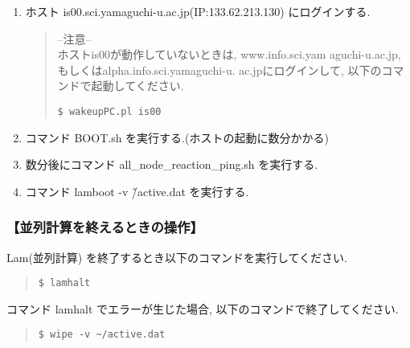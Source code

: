 \documentclass[a4paper,titlepage]{jreport}
\begin{document}
\begin{enumerate}
\item ホスト is00.sci.yamaguchi-u.ac.jp(IP:133.62.213.130) にログインする.\\

\begin{quote}
\begin{screen}
--注意-- \\

ホストis00が動作していないときは, www.info.sci.yam
aguchi-u.ac.jp,もしくはalpha.info.sci.yamaguchi-u.
ac.jpにログインして, 以下のコマンドで起動してください. \\

\begin{verbatim}
$ wakeupPC.pl is00
\end{verbatim}
\end{screen}
\end{quote}

\item コマンド BOOT.sh を実行する.(ホストの起動に数分かかる)

\item 数分後にコマンド all\_node\_reaction\_ping.sh を実行する.
\item コマンド lamboot -v \~/active.dat を実行する.
\end{enumerate}

\subsubsection{【並列計算を終えるときの操作】}
Lam(並列計算) を終了するとき以下のコマンドを実行してください.

\begin{quote}
\begin{screen}
\begin{verbatim}
$ lamhalt
\end{verbatim}
\end{screen}
\end{quote}

コマンド lamhalt でエラーが生じた場合, 以下のコマンドで終了してください.

\begin{quote}
\begin{screen}
\begin{verbatim}
$ wipe -v ~/active.dat
\end{verbatim}
\end{screen}
\end{quote}
\end{document}
